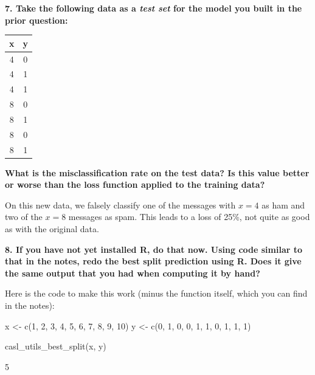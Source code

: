 \documentclass[12pt,hidelinks]{article}
\numberwithin{equation}{section}
\begin{document}
\vspace*{12pt}

\textbf{7. Take the following data as a \textit{test set} for the model you built
in the prior question:}

\begin{center}
\begin{tabular}{cc}
x & y \\ \hline
4 & 0 \\
4 & 1 \\
4 & 1 \\
8 & 0 \\
8 & 1 \\
8 & 0 \\
8 & 1 \\
\end{tabular}
\end{center}

\textbf{What is the misclassification rate on the test data? Is this value better or
worse than the loss function applied to the training data?}

\vspace*{12pt}

On this new data, we falsely classify one of the messages with $x=4$ as ham
and two of the $x=8$ messages as spam. This leads to a loss of 25\%, not quite
as good as with the original data.

\vspace*{12pt}

\textbf{8. If you have not yet installed R, do that now. Using code similar to
that in the notes, redo the best split prediction using R. Does it give the
same output that you had when computing it by hand?}

\vspace*{12pt}

Here is the code to make this work (minus the function itself, which you can
find in the notes):


\begin{rcode}
x <- c(1, 2, 3, 4, 5, 6, 7, 8, 9, 10)
y <- c(0, 1, 0, 0, 1, 1, 0, 1, 1, 1)

casl_utils_best_split(x, y)
\end{rcode}
\begin{rres}
[1] 5
\end{rres}
\end{document}
